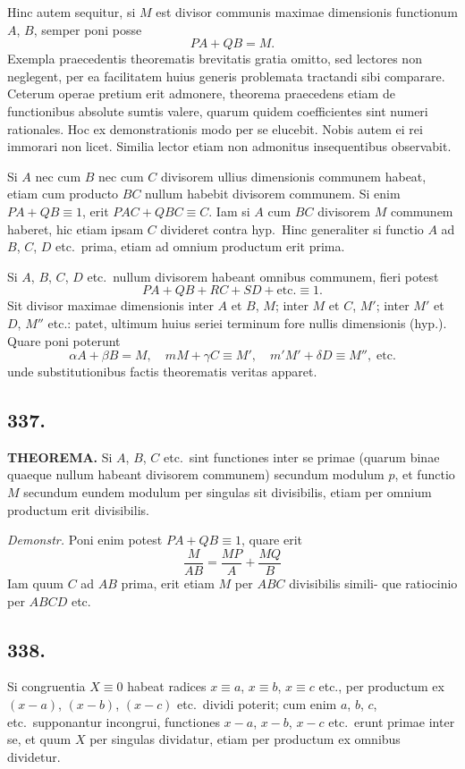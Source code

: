 \documentclass[12pt]{article}
\begin{document}
Hinc autem sequitur, si $M$ est divisor communis maximae dimensionis functionum $A$, $B$, semper poni posse
\[
PA + QB = M.
\]
Exempla praecedentis theorematis brevitatis gratia omitto, sed lectores non neglegent, per ea facilitatem huius generis problemata tractandi sibi comparare. Ceterum operae pretium erit admonere, theorema praecedens etiam de functionibus absolute sumtis valere, quarum quidem coefficientes sint numeri rationales. Hoc ex demonstrationis modo per se elucebit. Nobis autem ei rei immorari non licet. Similia lector etiam non admonitus insequentibus observabit.

Si $A$ nec cum $B$ nec cum $C$ divisorem ullius dimensionis communem habeat, etiam cum producto $BC$ nullum habebit divisorem communem. Si enim $PA+QB\equiv 1$, erit $PAC+QBC\equiv C$. Iam si $A$ cum $BC$ divisorem $M$ communem haberet, hic etiam ipsam $C$ divideret contra hyp.~Hinc generaliter si functio $A$ ad $B$, $C$, $D$ etc.~prima, etiam ad omnium productum erit prima.

Si $A$, $B$, $C$, $D$ etc.~nullum divisorem habeant omnibus communem, fieri potest
\[
PA + QB + RC + SD + \text{etc.} \equiv 1.
\]
Sit divisor maximae dimensionis inter $A$ et $B$, $M$; inter $M$ et $C$, $M'$; inter $M'$ et $D$, $M''$ etc.: patet, ultimum huius seriei terminum fore nullis dimensionis (hyp.). Quare poni poterunt
\[
\alpha A + \beta B = M,\quad mM + \gamma C \equiv M',\quad m'M' + \delta D \equiv M'',\; \text{etc.}
\]
unde substitutionibus factis theorematis veritas apparet.

\subsection*{337.}

\textbf{THEOREMA.} Si $A$, $B$, $C$ etc.~sint functiones inter se primae (quarum binae quaeque nullum habeant divisorem communem) secundum modulum $p$, et functio $M$ secundum eundem modulum per singulas sit divisibilis, etiam per omnium productum erit divisibilis.

\textit{Demonstr.} Poni enim potest $PA+QB\equiv 1$, quare erit
\[
\frac{M}{AB} = \frac{MP}{A} + \frac{MQ}{B}
\]
Iam quum $C$ ad $AB$ prima, erit etiam $M$ per $ABC$ divisibilis simili- que ratiocinio per $ABCD$ etc.

\subsection*{338.}

Si congruentia $X\equiv 0$ habeat radices $x\equiv a$, $x\equiv b$, $x\equiv c$ etc., per productum ex $(x-a)$, $(x-b)$, $(x-c)$ etc.~dividi poterit; cum enim $a$, $b$, $c$, etc.~supponantur incongrui, functiones $x-a$, $x-b$, $x-c$ etc.~erunt primae inter se, et quum $X$ per singulas dividatur, etiam per productum ex omnibus dividetur.
\end{document}
